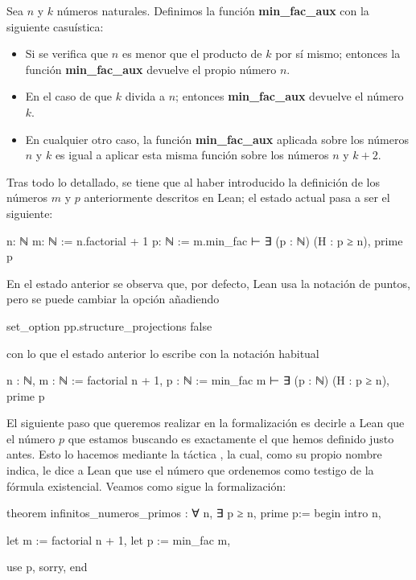 \begin{definicion}
  Sea \(n\) y \(k\) números naturales. Definimos la función
  \textbf{min\_fac\_aux} con la siguiente casuística:
  \begin{itemize}
  \item  Si se verifica que \(n\) es menor que el producto de \(k\) por sí
    mismo; entonces la función \textbf{min\_fac\_aux} devuelve el propio
    número \(n\).

  \item En el caso de que \(k\) divida a \(n\); entonces
    \textbf{min\_fac\_aux} devuelve el número \(k\).

  \item En cualquier otro caso, la función \textbf{min\_fac\_aux} aplicada
    sobre los números \(n\) y \(k\) es igual a aplicar esta misma función
    sobre los números \(n\) y \(k+2\).
  \end{itemize}
\end{definicion}

Tras todo lo detallado, se tiene que al haber introducido la definición de los
números \(m\) y \(p\) anteriormente descritos en Lean; el estado actual pasa a
ser el siguiente:
\begin{leancode}
n: ℕ
m: ℕ := n.factorial + 1
p: ℕ := m.min_fac
⊢ ∃ (p : ℕ) (H : p ≥ n), prime p
\end{leancode}

En el estado anterior se observa que, por defecto, Lean usa la notación
de puntos, pero se puede cambiar la opción añadiendo
\begin{leancode}
set_option pp.structure_projections false
\end{leancode}
con lo que el estado anterior lo escribe con la notación habitual
\begin{leancode}
n : ℕ,
m : ℕ := factorial n + 1,
p : ℕ := min_fac m
⊢ ∃ (p : ℕ) (H : p ≥ n), prime p
\end{leancode}

El siguiente paso que queremos realizar en la formalización es decirle a
Lean que el número \(p\) que estamos buscando es exactamente el que
hemos definido justo antes. Esto lo hacemos mediante la táctica
, la cual, como su propio nombre indica, le dice a
Lean que use el número que ordenemos como testigo de la fórmula
existencial. Veamos como sigue la formalización:

\begin{leancode}
theorem infinitos_numeros_primos : ∀ n, ∃ p ≥ n, prime p:=
begin
  intro n,

  let m := factorial n + 1,
  let p := min_fac m,

  use p,
  sorry,
end
\end{leancode}

